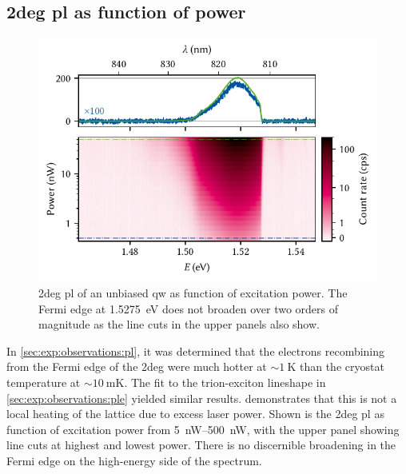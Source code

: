 \subsection{\texorpdfstring{\acrshort{2deg}}{2DEG} \texorpdfstring{\acrshort{pl}}{PL} as function of power}\label{subsec:app:exp:observations:meas:2deg}
\begin{figure}
    \centering
    \includegraphics{img/pdf/experiment/2deg_pl_power_dependence}
    \caption[
        \protect\newline
    ]{
        \Gls{2deg} \gls{pl} of an unbiased \gls{qw} as function of excitation power.
        The Fermi edge at \qty{1.5275}{\electronvolt} does not broaden over two orders of magnitude as the line cuts in the upper panels also show.
    }
    \label{fig:app:exp:observations:2deg_pl_power_dependence}
\end{figure}

In \cref{sec:exp:observations:pl}, it was determined that the electrons recombining from the Fermi edge of the \gls{2deg} were much hotter at $\sim\qty{1}{\kelvin}$ than the cryostat temperature at $\sim\qty{10}{\milli\kelvin}$.
The fit to the trion-exciton lineshape in \cref{sec:exp:observations:ple} yielded similar results.
 demonstrates that this is not a local heating of the lattice due to excess laser power.
Shown is the \gls{2deg} \gls{pl} as function of excitation power from \qtyrange{5}{500}{\nano\watt}, with the upper panel showing line cuts at highest and lowest power.
There is no discernible broadening in the Fermi edge on the high-energy side of the spectrum.

